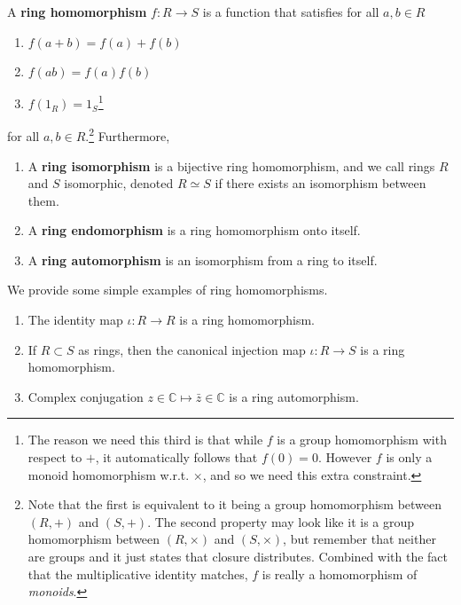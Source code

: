   \begin{definition}
    A \textbf{ring homomorphism} $f: R \rightarrow S$ is a function that satisfies for all $a, b \in R$
    \begin{enumerate}
      \item $f(a + b) = f(a) + f(b)$
      \item $f(ab) = f(a) f(b)$ 
      \item $f(1_R) = 1_S$\footnote{The reason we need this third is that while $f$ is a group homomorphism with respect to $+$, it automatically follows that $f(0) = 0$. However $f$ is only a monoid homomorphism w.r.t. $\times$, and so we need this extra constraint. }
    \end{enumerate}
    for all $a, b \in R$.\footnote{Note that the first is equivalent to it being a group homomorphism between $(R, +)$ and $(S, +)$. The second property may look like it is a group homomorphism between $(R, \times)$ and $(S, \times)$, but remember that neither are groups and it just states that closure distributes. Combined with the fact that the multiplicative identity matches, $f$ is really a homomorphism of \textit{monoids}. } Furthermore, 
    \begin{enumerate}
      \item A \textbf{ring isomorphism} is a bijective ring homomorphism, and we call rings $R$ and $S$ isomorphic, denoted $R \simeq S$ if there exists an isomorphism between them. 
      \item A \textbf{ring endomorphism} is a ring homomorphism onto itself. 
      \item A \textbf{ring automorphism} is an isomorphism from a ring to itself. 
    \end{enumerate}
  \end{definition} 

  \begin{example}
    We provide some simple examples of ring homomorphisms. 
    \begin{enumerate}
      \item The identity map $\iota : R \to R$ is a ring homomorphism. 
      \item If $R \subset S$ as rings, then the canonical injection map $\iota: R \to S$ is a ring homomorphism. 
      \item Complex conjugation $z \in \mathbb{C} \mapsto \bar{z} \in \mathbb{C}$ is a ring automorphism. 
    \end{enumerate}
  \end{example} 


